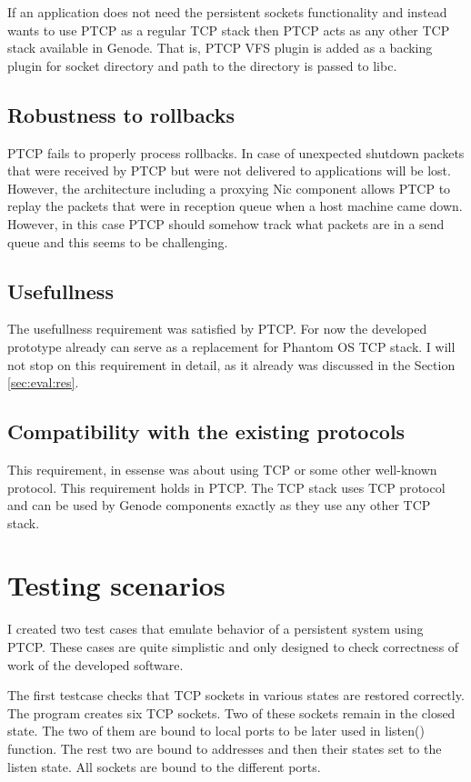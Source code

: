 If an application does not need the persistent sockets functionality and
instead wants to use PTCP as a regular TCP stack then PTCP acts as any other
TCP stack available in Genode. That is, PTCP VFS plugin is added as a backing
plugin for socket directory and path to the directory is passed to libc.

\subsection{Robustness to rollbacks}

PTCP fails to properly process rollbacks. In case of unexpected shutdown
packets that were received by PTCP but were not delivered to applications will
be lost. However, the architecture including a proxying Nic component allows
PTCP to replay the packets that were in reception queue when a host machine
came down. However, in this case PTCP should somehow track what packets are 
in a send queue and this seems to be challenging.

\subsection{Usefullness}

The usefullness requirement was satisfied by PTCP. For now the developed
prototype already can serve as a replacement for Phantom OS TCP stack. I will
not stop on this requirement in detail, as it already was discussed in the
Section \ref{sec:eval:res}.

\subsection{Compatibility with the existing protocols}

This requirement, in essense was about using TCP or some other well-known
protocol. This requirement holds in PTCP. The TCP stack uses TCP protocol and
can be used by Genode components exactly as they use any other TCP stack.

\section{Testing scenarios}

I created two test cases that emulate behavior of a persistent system using 
PTCP. These cases are quite simplistic and only designed to check correctness
of work of the developed software.

The first testcase checks that TCP sockets in various states are restored
correctly. The program creates six TCP sockets. Two of these sockets remain in
the closed state. The two of them are bound to local ports to be later used in
listen() function. The rest two are bound to addresses and then their states
set to the listen state. All sockets are bound to the different ports.


